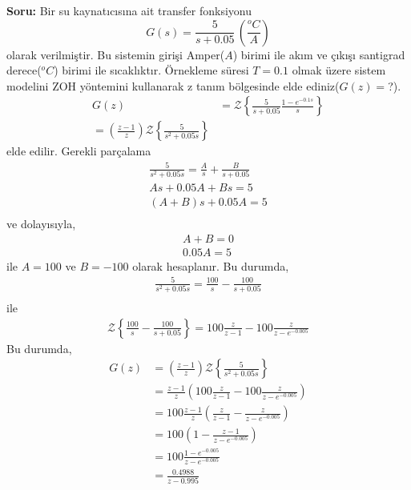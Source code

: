 \noindent\textbf{Soru:}  Bir su kaynatıcısına ait transfer fonksiyonu
\begin{equation}
    G(s)=\frac{5}{s+0.05}\,\left(\frac{^oC}{A}\right)
\end{equation}
olarak verilmiştir. Bu sistemin girişi Amper($A$) birimi ile akım ve çıkışı santigrad derece($^oC$) birimi ile sıcaklıktır. Örnekleme süresi $T=0.1$ olmak üzere sistem modelini ZOH yöntemini kullanarak z tanım bölgesinde elde ediniz($G(z)=$?).
\begin{equation}
\begin{split}
    G(z)&=\mathcal{Z}\left\{
        \frac{5}{s+0.05}\frac{1-e^{-0.1s}}{s}
    \right\}\\
    =\left(\frac{z-1}{z}\right)\mathcal{Z}\left\{
        \frac{5}{s^2+0.05s}
    \right\}
\end{split}
\end{equation}
elde edilir. Gerekli parçalama 
\begin{equation}
    \begin{split}
        \frac{5}{s^2+0.05s}=\frac{A}{s}+\frac{B}{s+0.05}\\
        As+0.05A+Bs=5\\
        (A+B)s+0.05A=5\\
    \end{split}
\end{equation}
ve dolayısıyla,
\begin{equation}
    \begin{split}
        A+B=0\\
        0.05A=5
    \end{split}
\end{equation}
ile $A=100$ ve $B=-100$ olarak hesaplanır. Bu durumda,
\begin{equation}
    \begin{split}
        \frac{5}{s^2+0.05s}=\frac{100}{s}-\frac{100}{s+0.05}\\
    \end{split}
\end{equation}
ile 
\begin{equation}
    \begin{split}
        \mathcal{Z}\left\{\frac{100}{s}-\frac{100}{s+0.05}\right\}=100\frac{z}{z-1}-100\frac{z}{z-e^{-0.005}}
    \end{split}
\end{equation}
Bu durumda,
\begin{equation}
    \begin{split}
        G(z)&=\left(\frac{z-1}{z}\right)\mathcal{Z}\left\{
            \frac{5}{s^2+0.05s}\right\}\\
            &=\frac{z-1}{z}\left(100\frac{z}{z-1}-100\frac{z}{z-e^{-0.005}}\right)\\
            &=100\frac{z-1}{z}\left(\frac{z}{z-1}-\frac{z}{z-e^{-0.005}}\right)\\
            &=100\left(1-\frac{z-1}{z-e^{-0.005}}\right)\\
            &=100\frac{1-e^{-0.005}}{z-e^{-0.005}}\\
            &=\frac{0.4988}{z-0.995}
    \end{split}
\end{equation}
